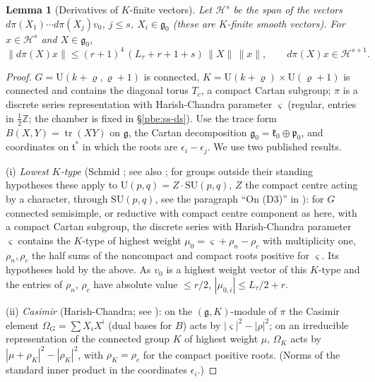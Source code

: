 \documentclass[10pt]{amsart}
\newtheorem{lemma}[theorem]{Lemma}
\theoremstyle{definition}
\theoremstyle{remark}
\newcommand{\Z}{\mathbb Z}
\providecommand{\auU}{\mathrm U}
\begin{document}
\begin{lemma}[Derivatives of $K$-finite vectors]\label{pbo:K}
Let $\mathcal H^s$ be the span of the vectors $d\pi(X_1)\cdots d\pi(X_j)v_0$, $j\le s$, $X_i\in\mathfrak g_0$
(these are $K$-finite smooth vectors). For $x\in\mathcal H^s$ and $X\in\mathfrak g_0$,
\[
\|d\pi(X)x\|\le(r+1)^4\,(L_\tau+r+1+s)\,\|X\|\,\|x\|,\qquad d\pi(X)x\in\mathcal H^{s+1}.
\]
\end{lemma}
\begin{proof}
$G=\mathrm U(k+\varrho,\varrho+1)$ is connected, $K=\mathrm U(k+\varrho)\times\mathrm U(\varrho+1)$ is connected and
contains the diagonal torus $T_c$, a compact Cartan subgroup; $\pi$ is a discrete series representation with
Harish-Chandra parameter $\varsigma$ (regular, entries in $\frac12\Z$; the chamber is fixed in \S\ref{pbe:ss-ds}).
Use the trace form $B(X,Y)=\operatorname{tr}(XY)$ on $\mathfrak g$, the Cartan decomposition $\mathfrak g_0=
\mathfrak k_0\oplus\mathfrak p_0$, and coordinates on $\mathfrak t^*$ in which the roots are $\epsilon_i-\epsilon_j$.
We use two published results.

(i) \emph{Lowest $K$-type} (Schmid \cite[Lemma~(2.22), Lemma~(3.8), Corollary~(3.9), Corollary~(4.19) and the proof of Theorem~(1.3) on p.~560]{Schmid75}; see also \cite[Theorem~(1.3), p.~130]{HechtSchmid75}; for groups outside their standing hypotheses these apply to $\auU(p,q)=Z\cdot\mathrm{SU}(p,q)$, $Z$ the compact centre acting by a character, through $\mathrm{SU}(p,q)$, see the paragraph ``On (D3)'' in {\cite[\S3.1.3]{P49}}): for $G$ connected semisimple, or reductive with compact centre component as here, with a
compact Cartan subgroup, the discrete series with Harish-Chandra parameter $\varsigma$ contains the $K$-type of
highest weight $\mu_0=\varsigma+\rho_n-\rho_c$ with multiplicity one, $\rho_n,\rho_c$ the half sums of the
noncompact and compact roots positive for $\varsigma$. Its hypotheses hold by the above. As $v_0$ is a highest
weight vector of this $K$-type and the entries of $\rho_n$, $\rho_c$ have absolute value $\le r/2$, $|\mu_{0,i}|\le
L_\tau/2+r$.

(ii) \emph{Casimir} (Harish-Chandra; see \cite[Theorem~8.18, (8.32) and the Example on p.~225]{Knapp}): on the $(\mathfrak g,K)$-module of $\pi$ the Casimir element $\Omega_G=\sum
X_iX^i$ (dual bases for $B$) acts by $|\varsigma|^2-|\rho|^2$; on an irreducible representation of the
connected group $K$ of highest weight $\mu$, $\Omega_K$ acts by $|\mu+\rho_K|^2-|\rho_K|^2$, with $\rho_K=\rho_c$ for
the compact positive roots. (Norms of the standard inner product in the coordinates $\epsilon_i$.)


\end{proof}
\end{document}
